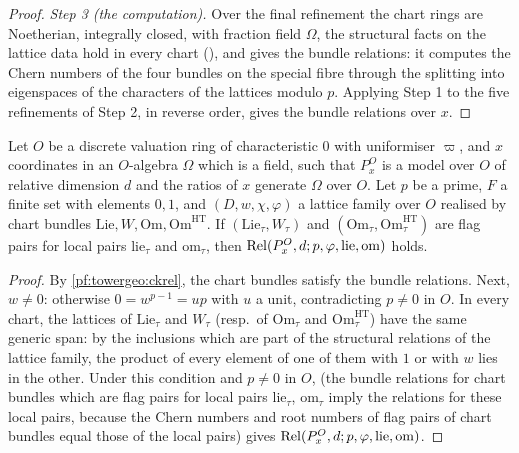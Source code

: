 \begin{proof}
\emph{Step 3 (the computation).} Over the final refinement the chart rings are Noetherian, integrally closed, with
fraction field $\Omega$, the structural facts on the lattice data hold in every chart
(), and
 gives the bundle relations: it computes the Chern
numbers of the four bundles on the special fibre through the splitting into eigenspaces of the characters of the
lattices modulo $p$. Applying Step 1 to the five refinements of Step 2, in reverse order, gives the bundle relations
over $x$.
\end{proof}

\begin{proposition}\label{pf:towergeo:relations}
Let $O$ be a discrete valuation ring of characteristic $0$ with uniformiser $\varpi$, and $x$ coordinates in
an $O$-algebra $\Omega$ which is a field, such that $P^O_x$ is a model over $O$ of relative dimension $d$
and the ratios of $x$ generate $\Omega$ over $O$. Let $p$ be a prime, $F$ a finite set with elements $0,1$,
and $(D,w,\chi,\varphi)$ a lattice family over $O$ realised by chart bundles
$\mathrm{Lie},W,\mathrm{Om},\mathrm{Om}^{\mathrm{HT}}$. If $(\mathrm{Lie}_\tau,W_\tau)$ and
$(\mathrm{Om}_\tau,\mathrm{Om}^{\mathrm{HT}}_\tau)$ are flag pairs for local pairs $\mathrm{lie}_\tau$ and
$\mathrm{om}_\tau$, then $\mathrm{Rel}(P^O_x,d;p,\varphi,\mathrm{lie},\mathrm{om})$ holds.
\end{proposition}

\begin{proof}
By \cref{pf:towergeo:ckrel}, the chart bundles satisfy the bundle relations. Next,
$w\ne0$: otherwise $0=w^{p-1}=up$ with $u$ a unit, contradicting $p\ne0$ in $O$. In every chart, the
lattices of $\mathrm{Lie}_\tau$ and $W_\tau$ (resp.\ of $\mathrm{Om}_\tau$ and $\mathrm{Om}^{\mathrm{HT}}_\tau$)
have the same generic span: by the inclusions which are part of the structural relations of the lattice
family, the product of every element of one of them with $1$ or with $w$ lies in the other. Under this
condition and $p\ne0$ in $O$,  (the bundle
relations for chart bundles which are flag pairs for local pairs $\mathrm{lie}_\tau$, $\mathrm{om}_\tau$
imply the relations for these local pairs, because the Chern numbers and root numbers of flag pairs of
chart bundles equal those of the local pairs) gives $\mathrm{Rel}(P^O_x,d;p,\varphi,\mathrm{lie},\mathrm{om})$.
\end{proof}

